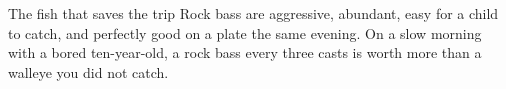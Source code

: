 \begin{telospanel}{The fish that saves the trip}
Rock bass are aggressive, abundant, easy for a child to catch, and perfectly good on a plate the same evening. On a slow morning with a bored ten-year-old, a rock bass every three casts is worth more than a walleye you did not catch. 
\end{telospanel}

\advisorypanfish

